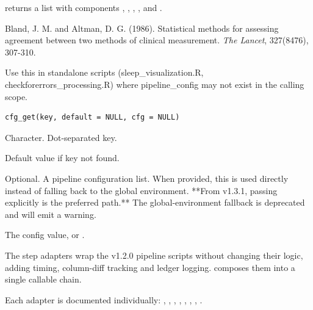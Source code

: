 \documentclass[a4paper]{book}
\begin{document}
%
\begin{Value}
 returns a list with components ,
, , , 
and .
\end{Value}
%
\begin{References}
Bland, J. M. and Altman, D. G. (1986). Statistical methods for
assessing agreement between two methods of clinical measurement.
\emph{The Lancet}, 327(8476), 307-310.
\end{References}
%
\begin{Description}
Use this in standalone scripts (sleep\_visualization.R, checkforerrors\_processing.R)
where pipeline\_config may not exist in the calling scope.
\end{Description}
%
\begin{Usage}
\begin{verbatim}
cfg_get(key, default = NULL, cfg = NULL)
\end{verbatim}
\end{Usage}
%
\begin{Arguments}
\begin{ldescription}
\item[\code{key}] Character. Dot-separated key.

\item[\code{default}] Default value if key not found.

\item[\code{cfg}] Optional. A pipeline configuration list. When provided, this
is used directly instead of falling back to the global environment.
**From v1.3.1, passing  explicitly is the preferred path.**
The global-environment fallback is deprecated and will emit a warning.
\end{ldescription}
\end{Arguments}
%
\begin{Value}
The config value, or .
\end{Value}
%
\begin{Description}
The step adapters wrap the v1.2.0 pipeline scripts without changing
their logic, adding timing, column-diff tracking and ledger logging.
 composes them into a single callable chain.
\end{Description}
%
\begin{Details}
Each adapter is documented individually: ,
,
, ,
, ,
,
.
\end{Details}
\end{document}
